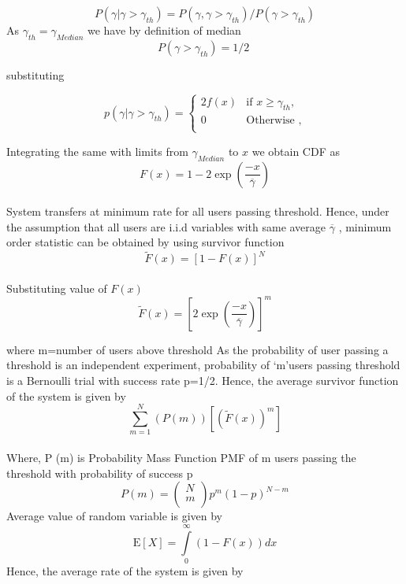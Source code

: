 \documentclass[conference]{IEEEtran}
\begin{document}
\[P(\gamma |\gamma >{{\gamma }_{th}})=P(\gamma ,\gamma >{{\gamma }_{th}})/P(\gamma >{{\gamma }_{th}})\] 
As ${{\gamma }_{th}}={{\gamma }_{Median}}$  we have by definition of median \\
	\[P(\gamma >{{\gamma }_{th}})={1}/{2}\;\]
 
substituting 


\begin{equation}
p(\gamma |\gamma >{{\gamma }_{th}}) =
\begin{cases}
 2f(x) & \text{if } x\ge {{\gamma }_{th}},\\
0 & \text{Otherwise } ,\\

\end{cases}
\end{equation}



Integrating the same with limits from ${{\gamma }_{Median}}$ to $x$ we obtain CDF as\\ 
\[F(x)=1-2\exp \left( \frac{-x}{\overline{\gamma }} \right)\] \\
System transfers at minimum rate for all users passing threshold. Hence, under the assumption that all users are i.i.d variables with same average $\overline{\gamma }$ , minimum order statistic can be obtained by using survivor function \\
\[\widetilde{F}(x)={{\left[ 1-F(x) \right]}^{N}}\]\\ 
Substituting value of $F\left( x \right)$   \\
	\[\widetilde{F}(x)={{\left[ 2\exp \left( \frac{-x}{\overline{\gamma }} \right) \right]}^{m}}\]
 
where m=number of users above threshold
As the probability of user passing a threshold is an independent experiment, probability of \textquoteleft m\textquoteright  users passing threshold is a Bernoulli trial with success rate p=1/2.
Hence, the average survivor function of the system is given by\\
 \[\sum\limits_{m=1}^{N}{\left( P(m) \right)\left[ {{\left( \widetilde{F}(x) \right)}^{m}} \right]}\] \\
Where, P (m) is Probability Mass Function PMF of m users passing the threshold with probability of success p
\[P(m)=\left( \begin{matrix}
   N  \\
   m  \\
\end{matrix} \right){{p}^{m}}{{(1-p)}^{N-m}}\]	
Average value of random variable is given by 
\[\text{E} \left[ X \right]=\int\limits_{0}^{\infty }{\left( 1-F\left( x \right) \right)}dx\]
Hence, the average rate of the system is given by
\end{document}
